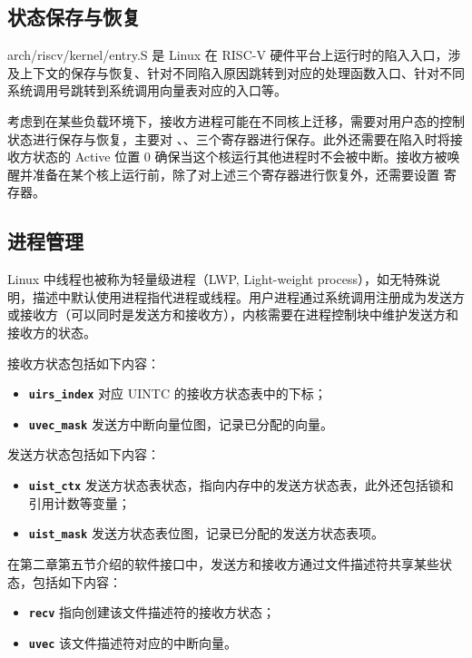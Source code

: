 \subsection{状态保存与恢复}

arch/riscv/kernel/entry.S 是 Linux 在 RISC-V 硬件平台上运行时的陷入入口，涉及上下文的保存与恢复、针对不同陷入原因跳转到对应的处理函数入口、针对不同系统调用号跳转到系统调用向量表对应的入口等。

考虑到在某些负载环境下，接收方进程可能在不同核上迁移，需要对用户态的控制状态进行保存与恢复，主要对 \Rutvec 、\Ruscratch、\Ruepc 三个寄存器进行保存。此外还需要在陷入时将接收方状态的 Active 位置 0 确保当这个核运行其他进程时不会被中断。接收方被唤醒并准备在某个核上运行前，除了对上述三个寄存器进行恢复外，还需要设置 \Rsuirs 寄存器。

\subsection{进程管理}

Linux 中线程也被称为轻量级进程（LWP, Light-weight process）\cite{linuxbook}，如无特殊说明，描述中默认使用进程指代进程或线程。用户进程通过系统调用注册成为发送方或接收方（可以同时是发送方和接收方），内核需要在进程控制块中维护发送方和接收方的状态。

接收方状态包括如下内容：

\begin{itemize}
    \item \texttt{\textbf{uirs\_index}} 对应 UINTC 的接收方状态表中的下标；
    \item \texttt{\textbf{uvec\_mask}} 发送方中断向量位图，记录已分配的向量。
\end{itemize}

发送方状态包括如下内容：

\begin{itemize}
    \item \texttt{\textbf{uist\_ctx}} 发送方状态表状态，指向内存中的发送方状态表，此外还包括锁和引用计数等变量；
    \item \texttt{\textbf{uist\_mask}} 发送方状态表位图，记录已分配的发送方状态表项。
\end{itemize}

在第二章第五节介绍的软件接口中，发送方和接收方通过文件描述符共享某些状态，包括如下内容：

\begin{itemize}
    \item \texttt{\textbf{recv}} 指向创建该文件描述符的接收方状态；
    \item \texttt{\textbf{uvec}} 该文件描述符对应的中断向量。
\end{itemize}

